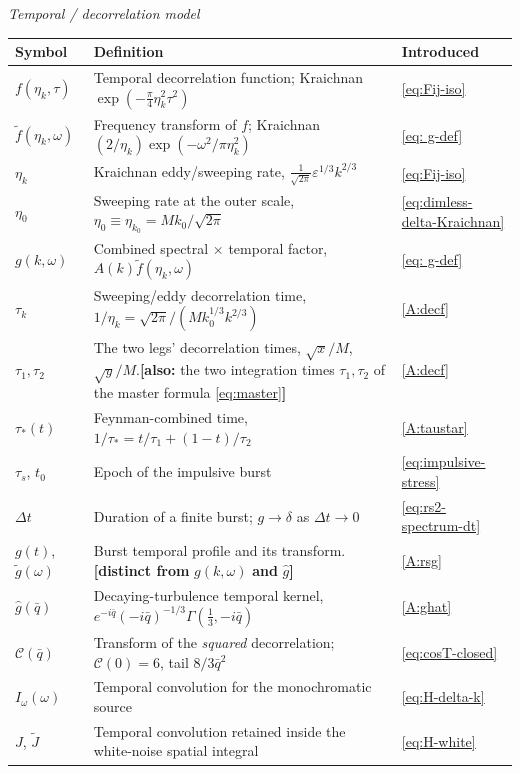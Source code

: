\documentclass[10pt,prd,aps,nobibnotes,superscriptaddress,preprintnumbers,notitlepage]{revtex4-1}
\newcommand{\tf}{\tilde{f}}
\begin{document}
\medskip\noindent \emph{Temporal / decorrelation model}\par\nobreak\smallskip
\noindent\begin{tabular}{@{}p{} p{} p{}@{}}
\hline\hline
Symbol & Definition & Introduced \\
\hline
$f(\eta_k,\tau)$      & Temporal decorrelation function; Kraichnan $\exp(-\tfrac{\pi}{4}\eta_k^2\tau^2)$ & \eqref{eq:Fij-iso}\\
$\tf(\eta_k,\omega)$  & Frequency transform of $f$; Kraichnan $(2/\eta_k)\exp(-\omega^2/\pi\eta_k^2)$ & \eqref{eq: g-def}\\
$\eta_k$              & Kraichnan eddy/sweeping rate, $\tfrac{1}{\sqrt{2\pi}}\varepsilon^{1/3}k^{2/3}$ & \eqref{eq:Fij-iso}\\
$\eta_0$              & Sweeping rate at the outer scale, $\eta_0\equiv\eta_{k_0}=Mk_0/\sqrt{2\pi}$ & \eqref{eq:dimless-delta-Kraichnan}\\
$g(k,\omega)$         & Combined spectral$\,\times\,$temporal factor, $A(k)\tf(\eta_k,\omega)$ & \eqref{eq: g-def}\\
$\tau_k$              & Sweeping/eddy decorrelation time, $1/\eta_k=\sqrt{2\pi}/(Mk_0^{1/3}k^{2/3})$ & \eqref{A:decf}\\
$\tau_1,\tau_2$\;[MULTI] & The two legs' decorrelation times, $\sqrt{x}/M$, $\sqrt{y}/M$.\quad\textbf{[also:} the two integration times $\tau_1,\tau_2$ of the master formula \eqref{eq:master}\textbf{]} & \eqref{A:decf}\\
$\tau_\ast(t)$        & Feynman-combined time, $1/\tau_\ast=t/\tau_1+(1-t)/\tau_2$ & \eqref{A:taustar}\\
$\tau_s$, $t_0$       & Epoch of the impulsive burst & \eqref{eq:impulsive-stress}\\
$\Delta t$            & Duration of a finite burst; $g\to\delta$ as $\Delta t\to0$ & \eqref{eq:rs2-spectrum-dt}\\
$g(t)$, $\tilde g(\omega)$\;[MULTI] & Burst temporal profile and its transform.\quad\textbf{[distinct from} $g(k,\omega)$ \textbf{and} $\hat g$\textbf{]} & \eqref{A:rsg}\\
$\hat g(\bar q)$      & Decaying-turbulence temporal kernel, $e^{-i\bar q}(-i\bar q)^{-1/3}\Gamma(\tfrac13,-i\bar q)$ & \eqref{A:ghat}\\
$\mathcal{C}(\bar q)$ & Transform of the \emph{squared} decorrelation; $\mathcal{C}(0)=6$, tail $8/3\bar q^2$ & \eqref{eq:cosT-closed}\\
$I_\omega(\omega)$    & Temporal convolution for the monochromatic source & \eqref{eq:H-delta-k}\\
$J$, $\tilde J$       & Temporal convolution retained inside the white-noise spatial integral & \eqref{eq:H-white}\\
\hline\hline
\end{tabular}\par
\end{document}
